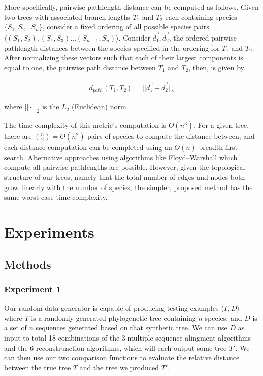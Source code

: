 \documentclass[10pt,twocolumn]{article}
\begin{document}
More specifically, pairwise pathlength distance can be computed as follows. Given two trees with associated branch lengths $T_1$ and $T_2$ each containing species $\{S_1, S_2 \ldots S_n\}$, consider a fixed ordering of all possible species pairs $\langle (S_1, S_2), (S_1, S_3) \ldots (S_{n-1}, S_n) \rangle$. Consider $\vec{d_1}, \vec{d_2}$, the ordered pairwise pathlength distances between the species specified in the ordering for $T_1$ and $T_2$. After normalizing these vectors such that each of their largest components is equal to one, the pairwise path distance between $T_1$ and $T_2$, then, is given by

\begin{align}
  d_{path}(T_1, T_2) = ||\vec{d_1} - \vec{d_2}||_2
\end{align}

where $||\cdot||_2$ is the $L_2$ (Euclidean) norm.

The time complexity of this metric's computation is $O(n^3)$. For a given tree, there are ${n \choose 2} = O(n^2)$ pairs of species to compute the distance between, and each distance computation can be completed using an $O(n)$ breadth first search. Alternative approaches using algorithms like Floyd–Warshall \cite{floyd1962algorithm} which compute all pairwise pathlengths are possible. However, given the topological structure of our trees, namely that the total number of edges and nodes both grow linearly with the number of species, the simpler, proposed method has the same worst-case time complexity.

\section*{Experiments}

\subsection*{Methods}
\subsubsection*{Experiment 1}
Our random data generator is capable of producing testing examples $\langle T, D \rangle$ where
$T$ is a randomly generated phylogenetic tree containing $n$ species, and $D$ is a set of $n$ 
sequences generated based on that synthetic tree. We can use $D$ as input to total 18 combinations of 
the 3 multiple sequence alingment algorithms and the 6 reconstrunction algorithms, which will each output 
some tree $T'$. We can then use our two comparison functions to evaluate the relative distance between 
the true tree $T$ and the tree we produced $T'$.
\end{document}
